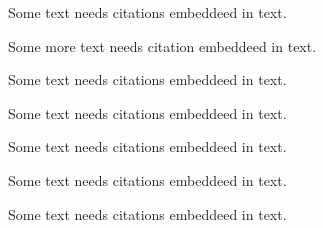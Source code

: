 \documentclass{article}
\begin{document}
Some text needs citations \autocite[100-101]{BOOK_REF:1} embeddeed in text.

Some more text needs citation \autocite[1]{BOOK_REF:2} embeddeed in text.

Some text needs citations \autocite[1]{BOOK_REF:3} embeddeed in text.

Some text needs citations \autocite[1]{ARTICLE_REF:1} embeddeed in text.

Some text needs citations \autocite[1]{ARTICLE_REF:2} embeddeed in text.

Some text needs citations \autocite[1]{WEBSITE_REF:1} embeddeed in text.

Some text needs citations \autocite[1]{WEBSITE_REF:2} embeddeed in text.

\newpage

\printbibliography
\end{document}
